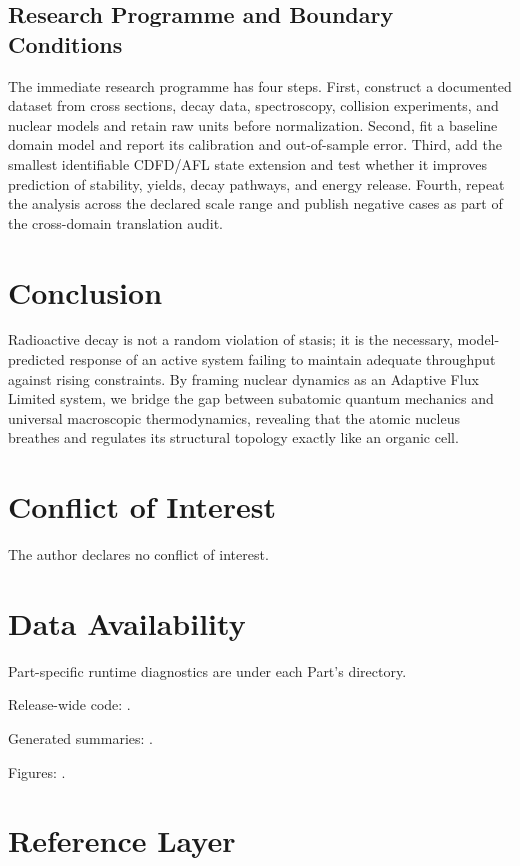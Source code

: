 \documentclass[11pt,a4paper]{article}
\begin{document}
\subsection{Research Programme and Boundary Conditions}

The immediate research programme has four steps. First, construct a documented
dataset from cross sections, decay data, spectroscopy, collision experiments, and nuclear models and retain raw units before normalization.
Second, fit a baseline domain model and report its calibration and out-of-sample
error. Third, add the smallest identifiable CDFD/AFL state extension and test
whether it improves prediction of stability, yields, decay pathways, and energy release. Fourth, repeat the
analysis across the declared scale range and publish negative cases as part of
the cross-domain translation audit.


\section{Conclusion}
Radioactive decay is not a random violation of stasis; it is the necessary, model-predicted response of an active system failing to maintain adequate throughput against rising constraints. By framing nuclear dynamics as an Adaptive Flux Limited system, we bridge the gap between subatomic quantum mechanics and universal macroscopic thermodynamics, revealing that the atomic nucleus breathes and regulates its structural topology exactly like an organic cell.
\section*{Conflict of Interest} The author declares no conflict of interest.
\section*{Data Availability}
Part-specific runtime diagnostics are under each Part's  directory.

Release-wide code: .

Generated summaries: .

Figures: .


\section{Reference Layer}


\end{document}
